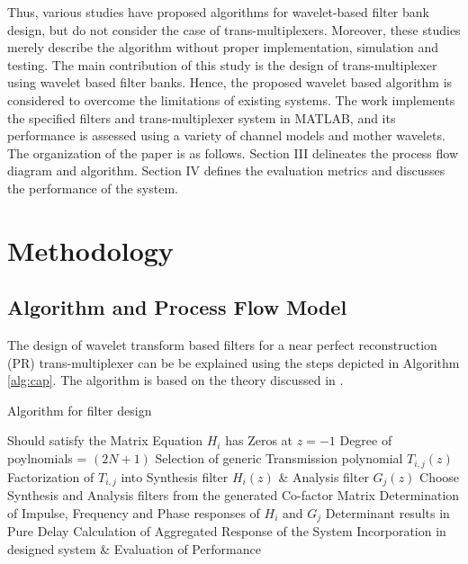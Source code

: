 \documentclass[conference]{IEEEtran}
\begin{document}
Thus, various studies have proposed algorithms for wavelet-based filter bank design, but do not consider the case of trans-multiplexers. Moreover, these studies merely describe the algorithm without proper implementation, simulation and testing. The main contribution of this study is the design of trans-multiplexer using wavelet based  filter banks. Hence, the proposed wavelet based algorithm is considered to overcome the limitations of existing systems. The work implements the specified filters and trans-multiplexer system in MATLAB, and its performance is assessed using a variety of channel models and mother wavelets. The organization of the paper is as follows. Section III delineates the process flow diagram and algorithm. Section IV defines the evaluation metrics and discusses the performance of the system.

\section{Methodology}
\subsection{Algorithm and Process Flow Model}
The design of wavelet transform based filters for a near perfect reconstruction (PR) trans-multiplexer can be be explained using the steps depicted in Algorithm \ref{alg:cap}. The algorithm is based on the theory discussed in \cite{b2} \cite{b5} \cite{b9}.

\begin{algorithm}
\caption{Algorithm for filter design}\label{alg:cap}
\begin{algorithmic}
\Require Should satisfy the Matrix Equation
\Ensure $H_i$ has Zeros at $z=-1$
\Ensure Degree of poylnomials = $(2N+1)$
\State Selection of generic Transmission polynomial $T_{i,j}(z)$
\State Factorization of $T_{i,j}$ into Synthesis filter $H_i(z)$ \& Analysis filter $G_j(z)$
\State Choose Synthesis and Analysis filters from the generated Co-factor Matrix
\State Determination of Impulse, Frequency and Phase responses of $H_i$ and $G_j$
\Ensure Determinant results in Pure Delay
\State Calculation of Aggregated Response of the System
\State Incorporation in designed system \& Evaluation of Performance
\EndFor
\end{algorithmic}
\end{algorithm}

\end{document}
